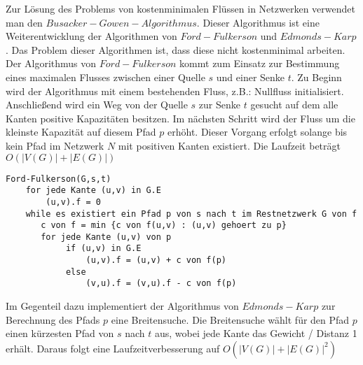 Zur Lösung des Problems von kostenminimalen Flüssen in Netzwerken verwendet
man den $Busacker-Gowen-Algorithmus$. Dieser Algorithmus ist eine 
Weiterentwicklung der Algorithmen von $Ford-Fulkerson$ und $Edmonds-Karp$. 
Das Problem dieser Algorithmen ist, dass diese nicht kostenminimal arbeiten. 
Der Algorithmus von $Ford-Fulkerson$ kommt zum Einsatz zur Bestimmung eines 
maximalen Flusses zwischen einer Quelle $s$ und einer Senke $t$. Zu Beginn 
wird der Algorithmus mit einem bestehenden Fluss, z.B.: Nullfluss 
initialisiert. Anschließend wird ein Weg von der Quelle $s$ zur Senke $t$ 
gesucht auf dem alle Kanten positive Kapazitäten besitzen. Im nächsten 
Schritt wird der Fluss um die kleinste Kapazität auf diesem Pfad $p$
erhöht. Dieser Vorgang erfolgt solange bis kein Pfad im Netzwerk $N$ mit 
positiven Kanten existiert. Die Laufzeit beträgt $O(|V(G)| + |E(G)|)$ 
\cite{algo, optiv}\\

\begin{lstlisting}
Ford-Fulkerson(G,s,t)
    for jede Kante (u,v) in G.E 
        (u,v).f = 0
    while es existiert ein Pfad p von s nach t im Restnetzwerk G von f
       c von f = min {c von f(u,v) : (u,v) gehoert zu p}
       for jede Kante (u,v) von p
            if (u,v) in G.E
                (u,v).f = (u,v) + c von f(p)
            else
                (v,u).f = (v,u).f - c von f(p)
\end{lstlisting}

Im Gegenteil dazu implementiert der Algorithmus von $Edmonds-Karp$ zur 
Berechnung des Pfads $p$ eine Breitensuche. Die Breitensuche wählt für den 
Pfad $p$ einen kürzesten Pfad von $s$ nach $t$ aus, wobei jede Kante das 
Gewicht / Distanz 1 erhält. Daraus folgt eine Laufzeitverbesserung auf 
$O(|V(G)| + |E(G)|^2)$ \cite{algo, optiv}

